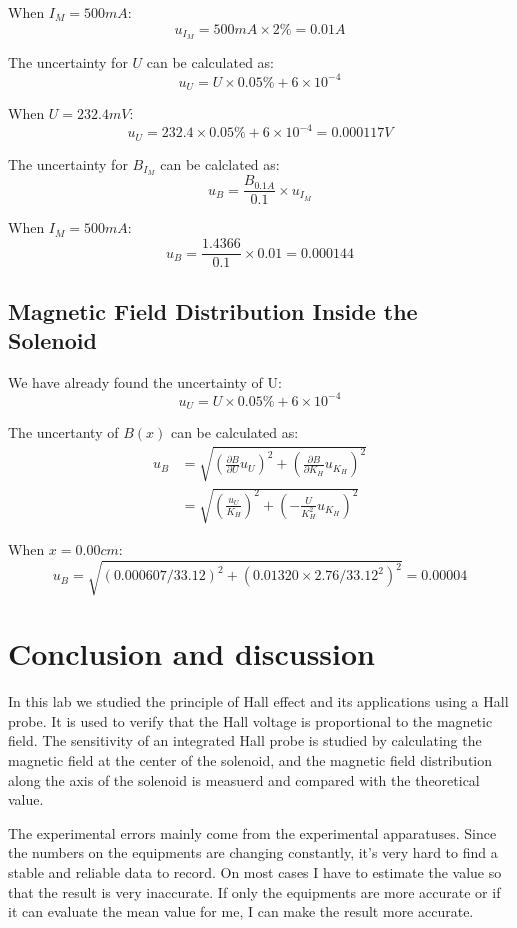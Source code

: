 \documentclass[12pt, a4paper]{article}
\begin{document}
When $I_M = 500mA$:
$$
u_{I_M} = 500mA \times 2\% = 0.01A
$$

The uncertainty for $U$ can be calculated as:
$$
u_U = U \times 0.05\% + 6\times 10^{-4}
$$

When $U = 232.4 mV$:
$$
u_U = 232.4 \times 0.05\% + 6 \times 10^{-4} = 0.000117V
$$

The uncertainty for $B_{I_M}$ can be calclated as:
$$
u_B = \frac{B_{0.1A}}{0.1} \times u_{I_M}
$$

When $I_M = 500 mA$:
$$
u_B = \frac{1.4366}{0.1}\times 0.01 = 0.000144
$$

\subsection{Magnetic Field Distribution Inside the Solenoid}
We have already found the uncertainty of U:
$$
u_U = U\times 0.05\% + 6\times 10^{-4}
$$

The uncertanty of $B(x)$ can be calculated as:
\begin{align*}
	u_B &= \sqrt{\left( \frac{\partial B}{\partial U}u_U \right)^2 + \left( \frac{\partial B}{\partial K_H}u_{K_H} \right)^2 }
	\\  &= \sqrt{\left(\frac{u_U}{K_H}\right)^2 + \left( - \frac{U}{K_H^2}u_{K_H}\right)^2}
\end{align*}

When $x = 0.00 cm$:
$$
u_B = \sqrt{(0.000607/33.12)^2+(0.01320\times2.76/33.12^2)^2} = 0.00004
$$

\section{Conclusion and discussion}
In this lab we studied the principle of Hall effect and its applications using a Hall probe. It 
is used to verify that the Hall voltage is proportional to the magnetic field. The sensitivity of 
an integrated Hall probe is studied by calculating the magnetic field at the center of the solenoid, 
and the magnetic field distribution along the axis of the solenoid is measuerd and compared with 
the theoretical value.

The experimental errors mainly come from the experimental apparatuses. Since the numbers on the equipments 
are changing constantly, it's very hard to find a stable and reliable data to record. On most cases I have to 
estimate the value so that the result is very inaccurate. If only the equipments are more accurate or if it can 
evaluate the mean value for me, I can make the result more accurate.
\end{document}
